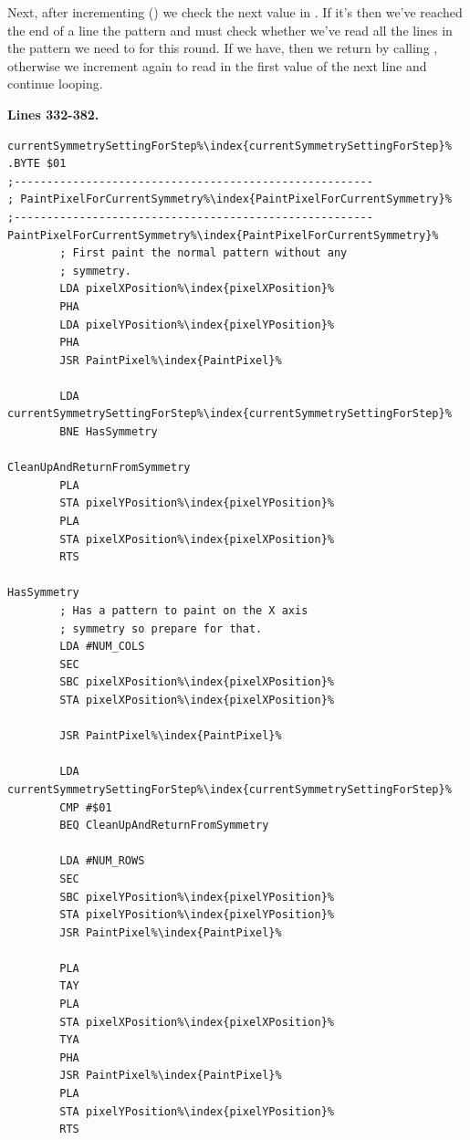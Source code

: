 Next, after incrementing  () we check the next value in . If it's  then
we've reached the end of a line the pattern and must check whether we've read all the lines in the pattern we need to for this
round. If we have, then we return by calling , otherwise we increment  again to read
in the first value of the next line and continue looping.

\clearpage
\textbf{Lines 332-382. }
\begin{lstlisting}[basicstyle=\ttfamily\scriptsize,caption=Choosing what to paint based on the current symmetry setting.,escapechar=\%]
currentSymmetrySettingForStep%\index{currentSymmetrySettingForStep}%   .BYTE $01
;-------------------------------------------------------
; PaintPixelForCurrentSymmetry%\index{PaintPixelForCurrentSymmetry}%
;-------------------------------------------------------
PaintPixelForCurrentSymmetry%\index{PaintPixelForCurrentSymmetry}%   
        ; First paint the normal pattern without any
        ; symmetry.
        LDA pixelXPosition%\index{pixelXPosition}%
        PHA 
        LDA pixelYPosition%\index{pixelYPosition}%
        PHA 
        JSR PaintPixel%\index{PaintPixel}%

        LDA currentSymmetrySettingForStep%\index{currentSymmetrySettingForStep}%
        BNE HasSymmetry

CleanUpAndReturnFromSymmetry   
        PLA 
        STA pixelYPosition%\index{pixelYPosition}%
        PLA 
        STA pixelXPosition%\index{pixelXPosition}%
        RTS 

HasSymmetry   
        ; Has a pattern to paint on the X axis
        ; symmetry so prepare for that.
        LDA #NUM_COLS
        SEC 
        SBC pixelXPosition%\index{pixelXPosition}%
        STA pixelXPosition%\index{pixelXPosition}%

        JSR PaintPixel%\index{PaintPixel}%

        LDA currentSymmetrySettingForStep%\index{currentSymmetrySettingForStep}%
        CMP #$01
        BEQ CleanUpAndReturnFromSymmetry

        LDA #NUM_ROWS
        SEC 
        SBC pixelYPosition%\index{pixelYPosition}%
        STA pixelYPosition%\index{pixelYPosition}%
        JSR PaintPixel%\index{PaintPixel}%

        PLA 
        TAY 
        PLA 
        STA pixelXPosition%\index{pixelXPosition}%
        TYA 
        PHA 
        JSR PaintPixel%\index{PaintPixel}%
        PLA 
        STA pixelYPosition%\index{pixelYPosition}%
        RTS 

\end{lstlisting}
\clearpage

